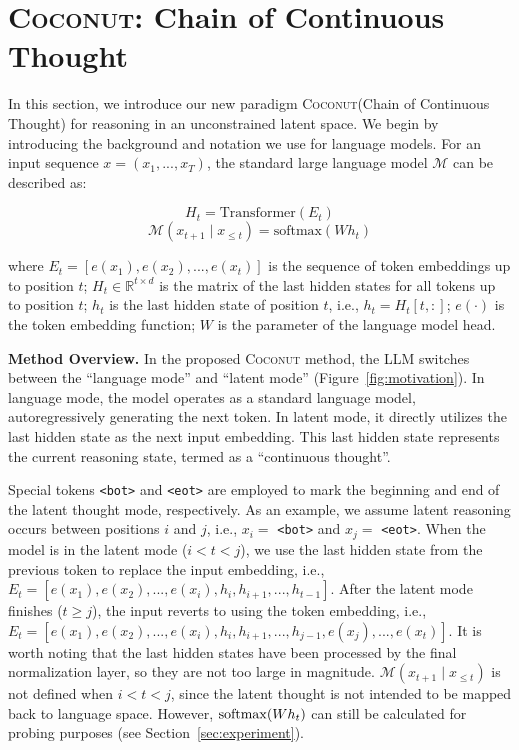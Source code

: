 \documentclass[]{fairmeta}
\newcommand{\ours}{\textsc{Coconut}\xspace}
\begin{document}
\section{\ours: Chain of Continuous Thought}
In this section, we introduce our new paradigm \ours (Chain of Continuous Thought) for reasoning in an unconstrained latent space. We begin by introducing the background and notation we use for language models. For an input sequence $x = (x_1, ..., x_T)$, the standard large language model $\mathcal{M}$ can be described as:

$$H_t = \text{Transformer}(E_t)$$
$$\mathcal{M}(x_{t+1}\mid x_{\leq t}) = \text{softmax}(Wh_t)$$

where $E_t = [e(x_1), e(x_2), ..., e(x_t)]$ is the sequence of token embeddings up to position $t$;
$H_t \in \mathbb{R}^{t \times d}$ is the matrix of the last hidden states for all tokens up to position $t$; $h_t$ is the last hidden state of position $t$, i.e., $h_t=H_t[t, :]$; $e(\cdot)$ is the token embedding function; $W$ is the parameter of the language model head.

\noindent\textbf{Method Overview.} In the proposed \ours method, the LLM switches between the ``language mode'' and ``latent mode'' (Figure~\ref{fig:motivation}). In language mode, the model operates as a standard language model, autoregressively generating the next token. In latent mode, it directly utilizes the last hidden state as the next input embedding. This last hidden state represents the current reasoning state, termed as a ``continuous thought''.

Special tokens \texttt{<bot>} and \texttt{<eot>} are employed to mark the beginning and end of the latent thought mode, respectively. As an example, we assume latent reasoning occurs between positions $i$ and $j$, i.e., $x_i=$ \texttt{<bot>} and $x_j=$ \texttt{<eot>}. When the model is in the latent mode ($i < t < j$), we use the last hidden state from the previous token to replace the input embedding, i.e., $E_t=[e(x_1), e(x_2), ..., e(x_i), h_i, h_{i+1}, ..., h_{t-1}]$. After the latent mode finishes ($t \ge j$), the input reverts to using the token embedding, i.e., $E_t=[e(x_1), e(x_2), ..., e(x_i), h_i, h_{i+1}, ..., h_{j-1}, e(x_j), ..., e(x_t)]$. 
It is worth noting that the last hidden states have been processed by the final normalization layer, so they are not too large in magnitude.
$\mathcal{M}(x_{t+1}\mid x_{\leq t})$ is not defined when $i<t<j$, since the latent thought is not intended to be mapped back to language space. However, $\mathrm{softmax}(Wh_t)$ can still be calculated for probing purposes (see Section~\ref{sec:experiment}).
\end{document}

